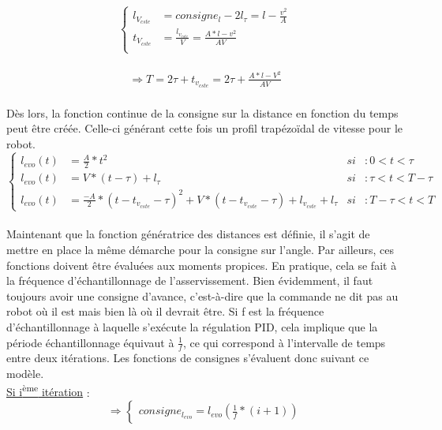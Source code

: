 \documentclass[a4paper,11pt]{article}
\begin{document}
\begin{equation*}
    \left\{
        \begin{aligned}
        l_{V_{cste}} &= consigne_{l} - 2l_{\tau}  = l - \frac{v^2}{A}\\
        t_{V_{cste}} &= \frac{l_{v_{cste}}}{V}  = \frac{A*l-v^2}{AV}\\
        \end{aligned}
    \right.
\end{equation*}\\
\begin{equation*}
    \left.
        \begin{aligned}
        \Rightarrow T = 2\tau + t_{v_{cste}}  = 2\tau + \frac{A*l-V^2}{AV}
        \end{aligned}
    \right.
\end{equation*}\\
Dès lors, la fonction continue de la consigne sur la distance en fonction du temps peut être créée. Celle-ci générant cette fois un profil trapézoïdal de vitesse pour le robot.
\begin{equation*}
    \left\{
        \begin{aligned}
        l_{evo}(t) & = \frac{A}{2}*t^2 &si&: 0<t<\tau\\
        l_{evo}(t) & = V*(t-\tau) + l_{\tau} &si&: \tau<t<T-\tau\\
        l_{evo}(t) & = \frac{-A}{2}*(t-t_{v_{cste}}-\tau)^2 + V*(t-t_{v_{cste}}-\tau) + l_{v_{cste}} + l_{\tau} & si&: T-\tau < t < T
        \end{aligned}
    \right.
\end{equation*}\\
Maintenant que la fonction génératrice des distances est définie, il s'agit de mettre en place la même démarche pour la consigne sur l'angle. Par ailleurs, ces fonctions doivent être évaluées aux moments propices. En pratique, cela se fait à la fréquence d'échantillonnage de l'asservissement. Bien évidemment, il faut toujours avoir une consigne d'avance, c'est-à-dire que la commande ne dit pas au robot où il est mais bien là où il devrait être.
Si f est la fréquence d'échantillonnage à laquelle s'exécute la régulation PID, cela implique que la période échantillonnage équivaut à $\frac{1}{f}$, ce qui correspond à l'intervalle de temps entre deux itérations. Les fonctions de consignes s'évaluent donc suivant ce modèle.\\
\underline{Si i\textsuperscript{ème} itération} :
\begin{equation*}
    \Rightarrow\left\{
        \begin{aligned}
        consigne_{l_{evo}} = l_{evo}(\frac{1}{f}*(i+1))
        \end{aligned}
    \right.
\end{equation*}
\end{document}
